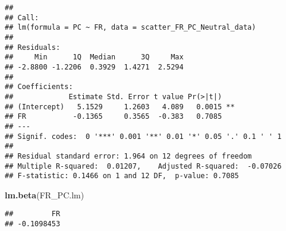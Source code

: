 \documentclass[
]{article}
\newenvironment{Shaded}{\begin{snugshade}}{\end{snugshade}}
\newcommand{\KeywordTok}[1]{\textcolor[rgb]{0.13,0.29,0.53}{\textbf{#1}}}
\newcommand{\NormalTok}[1]{#1}
\begin{document}
\begin{verbatim}
## 
## Call:
## lm(formula = PC ~ FR, data = scatter_FR_PC_Neutral_data)
## 
## Residuals:
##     Min      1Q  Median      3Q     Max 
## -2.8800 -1.2206  0.3929  1.4271  2.5294 
## 
## Coefficients:
##             Estimate Std. Error t value Pr(>|t|)   
## (Intercept)   5.1529     1.2603   4.089   0.0015 **
## FR           -0.1365     0.3565  -0.383   0.7085   
## ---
## Signif. codes:  0 '***' 0.001 '**' 0.01 '*' 0.05 '.' 0.1 ' ' 1
## 
## Residual standard error: 1.964 on 12 degrees of freedom
## Multiple R-squared:  0.01207,    Adjusted R-squared:  -0.07026 
## F-statistic: 0.1466 on 1 and 12 DF,  p-value: 0.7085
\end{verbatim}

\begin{Shaded}
\begin{Highlighting}[]
\KeywordTok{lm.beta}\NormalTok{(FR_PC.lm)}
\end{Highlighting}
\end{Shaded}

\begin{verbatim}
##         FR 
## -0.1098453
\end{verbatim}
\end{document}
